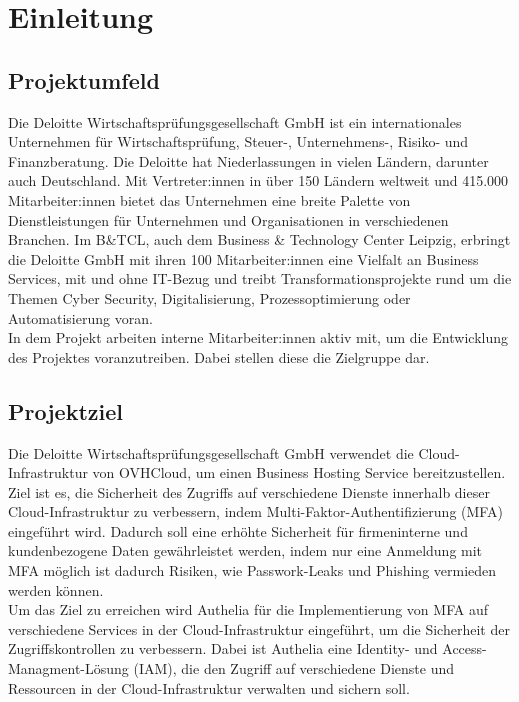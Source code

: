 \section{Einleitung}
\label{sec:Einleitung}


\subsection{Projektumfeld} 
\label{sec:Projektumfeld}
Die Deloitte Wirtschaftsprüfungsgesellschaft GmbH ist ein internationales 
Unternehmen für Wirtschaftsprüfung, Steuer-, Unternehmens-, Risiko- und Finanzberatung.
Die Deloitte hat Niederlassungen in vielen Ländern, darunter auch Deutschland. 
Mit Vertreter:innen in über 150 Ländern weltweit und 415.000 Mitarbeiter:innen bietet das Unternehmen eine breite Palette von Dienstleistungen für Unternehmen und Organisationen in verschiedenen Branchen.
Im B\&TCL, auch dem Business \& Technology Center Leipzig, erbringt die Deloitte
GmbH mit ihren 100 Mitarbeiter:innen eine Vielfalt an Business Services, mit und ohne IT-Bezug und treibt
Transformationsprojekte rund um die Themen Cyber Security, Digitalisierung,
Prozessoptimierung oder Automatisierung voran.
\\In dem Projekt arbeiten interne Mitarbeiter:innen aktiv mit, um die Entwicklung des
Projektes voranzutreiben. Dabei stellen diese die Zielgruppe dar.


\subsection{Projektziel} 
\label{sec:Projektziel}
Die Deloitte Wirtschaftsprüfungsgesellschaft GmbH verwendet die Cloud-Infrastruktur
von OVHCloud, um einen Business Hosting Service bereitzustellen. 
\\Ziel ist es, die Sicherheit des Zugriffs auf verschiedene Dienste 
innerhalb dieser Cloud-Infrastruktur zu verbessern, indem 
Multi-Faktor-Authentifizierung (MFA) eingeführt wird. 
Dadurch soll eine erhöhte Sicherheit für firmeninterne und kundenbezogene 
Daten gewährleistet werden, indem nur eine Anmeldung mit MFA möglich ist dadurch Risiken, 
wie Passwork-Leaks und Phishing vermieden werden können.
\\Um das Ziel zu erreichen wird Authelia für die Implementierung von MFA auf verschiedene Services 
in der Cloud-Infrastruktur eingeführt, um die Sicherheit der Zugriffskontrollen zu verbessern. 
Dabei ist Authelia eine Identity- und Access-Managment-Lösung (IAM), die den Zugriff auf 
verschiedene Dienste und Ressourcen in der Cloud-Infrastruktur verwalten und sichern soll. 


